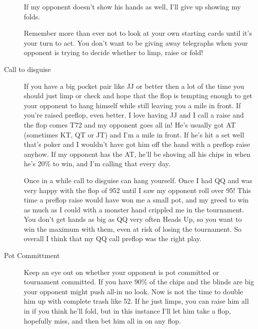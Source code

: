 \begin{description}
If my opponent doesn't show his hands as well, I'll give
up showing my folds.

Remember more than ever not to look at your own
starting cards until it's your turn to act. You
don't want to be giving away telegraphs when your
opponent is trying to decide whether to limp, raise
or fold!

\item[Call to disguise] If you have a big pocket
pair like JJ or better then a lot of the time
you should just limp or check and hope that the
flop is tempting enough to get your opponent to hang himself
while still leaving you a mile in front. If you're
raised preflop, even better. I love having JJ
and I call a raise and the flop comes T72 and my
opponent goes all in! He's usually got AT (sometimes
KT, QT or JT) and I'm a mile in front. If he's hit
a set well that's poker and I wouldn't have got him
off the hand with a preflop raise anyhow. If my
opponent has the AT, he'll be shoving
all his chips in when he's 20\% to win, and I'm calling
that every day.

Once in a while call to disguise can hang yourself. Once
I had QQ and was very happy with the flop of 952 until I
saw my opponent roll over 95! This time a preflop raise
would have won me a small pot, and my greed to win as much
as I could with a monster hand crippled me in the tournament.
You don't get hands as big as QQ very often Heads Up, so
you want to win the maximum with them, even at risk
of losing the tournament. So overall I think that my QQ call
preflop was the right play.

\item[Pot Committment] Keep an eye out on whether your opponent is pot committed
or tournament committed. If you have 90\% of the chips and
the blinds are big your opponent might push all-in no look.
Now is not the time to double him up with complete trash like
52. If he just limps, you can raise him all in if you think
he'll fold, but in this instance I'll let him take a flop,
hopefully miss, and then bet him all in on any flop.

\end{description}
